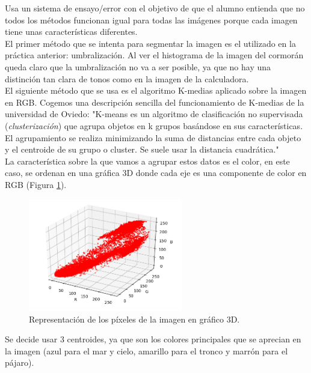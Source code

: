 \documentclass[a4paper,12pt]{report}
\begin{document}
Usa un sistema de ensayo/error con el objetivo de que el alumno entienda que no todos los métodos funcionan igual para todas las imágenes porque cada imagen tiene unas características diferentes.\\

El primer método que se intenta para segmentar la imagen es el utilizado en la práctica anterior: umbralización. Al ver el histograma de la imagen del cormorán queda claro que la umbralización no va a ser posible, ya que no hay una distinción tan clara de tonos como en la imagen de la calculadora.\\

El siguiente método que se usa es el algoritmo K-medias aplicado sobre la imagen en RGB. Cogemos una descripción sencilla del funcionamiento de K-medias de la universidad de Oviedo: "K-means es un algoritmo de clasificación no supervisada (\emph{clusterización}) que agrupa objetos en k grupos basándose en sus características. El agrupamiento se realiza minimizando la suma de distancias entre cada objeto y el centroide de su grupo o cluster. Se suele usar la distancia cuadrática."\\

La característica sobre la que vamos a agrupar estos datos es el color, en este caso, se ordenan en una gráfica 3D donde cada eje es una componente de color en RGB (Figura \ref{cormoranrgb}).\\

\begin{figure}[h]
\centering
\includegraphics[width=0.6\textwidth]{imagenes/cormoranrgb}
\caption{Representación de los píxeles de la imagen en gráfico 3D.}
\label{cormoranrgb}
\end{figure}

 Se decide usar 3 centroides, ya que son los colores principales que se aprecian en la imagen (azul para el mar y cielo, amarillo para el tronco y marrón para el pájaro).\\
\end{document}

